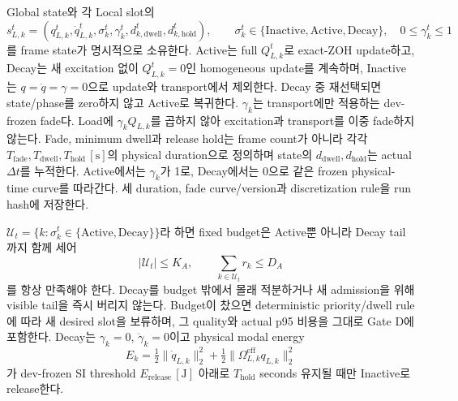 \documentclass[11pt]{article}
\begin{document}
Global state와 각 Local slot의
\begin{equation}
  s_{L,k}^t=(q_{L,k}^t,\dot q_{L,k}^t,\sigma_k^t,\gamma_k^t,
  d_{k,\mathrm{dwell}}^t,d_{k,\mathrm{hold}}^t),\qquad
  \sigma_k^t\in\{\mathrm{Inactive},\mathrm{Active},\mathrm{Decay}\},\quad
  0\le\gamma_k^t\le1
  \label{eq:rd-local-runtime-state}
\end{equation}
를 frame state가 명시적으로 소유한다. Active는 full \(Q_{L,k}^t\)로 exact-ZOH update하고,
Decay는 새 excitation 없이 \(Q_{L,k}^t=0\)인 homogeneous update를 계속하며,
Inactive는 \(q=\dot q=\gamma=0\)으로 update와 transport에서 제외한다.
Decay 중 재선택되면 state/phase를 zero하지 않고 Active로 복귀한다.
\(\gamma_k\)는 transport에만 적용하는 dev-frozen fade다. Load에
\(\gamma_k Q_{L,k}\)를 곱하지 않아 excitation과 transport를 이중 fade하지 않는다.
Fade, minimum dwell과 release hold는 frame count가 아니라 각각
\(T_{\mathrm{fade}},T_{\mathrm{dwell}},T_{\mathrm{hold}}\,[\mathrm s]\)의 physical duration으로
정의하며 state의 \(d_{\mathrm{dwell}},d_{\mathrm{hold}}\)는 actual \(\Delta t\)를 누적한다.
Active에서는 \(\gamma_k\)가 1로, Decay에서는 0으로 같은 frozen physical-time curve를 따라간다.
세 duration, fade curve/version과 discretization rule을 run hash에 저장한다.

\(\mathcal U_t=\{k:\sigma_k^t\in\{\mathrm{Active},\mathrm{Decay}\}\}\)라 하면 fixed budget은
Active뿐 아니라 Decay tail까지 함께 세어
\[
  |\mathcal U_t|\le K_A,\qquad \sum_{k\in\mathcal U_t}r_k\le D_A
\]
를 항상 만족해야 한다. Decay를 budget 밖에서 몰래 적분하거나 새 admission을 위해 visible tail을 즉시
버리지 않는다. Budget이 찼으면 deterministic priority/dwell rule에 따라 새 desired slot을 보류하며,
그 quality와 actual p95 비용을 그대로 Gate D에 포함한다. Decay는 \(\gamma_k=0\),
\(\dot\gamma_k=0\)이고 physical modal energy
\[
  E_k=\tfrac12\|\dot q_{L,k}\|_2^2+
  \tfrac12\|\Omega_{L,k}^{\mathrm{eff}}q_{L,k}\|_2^2
\]
가 dev-frozen SI threshold \(E_{\mathrm{release}}\,[\mathrm J]\) 아래로
\(T_{\mathrm{hold}}\) seconds 유지될 때만 Inactive로 release한다.
\end{document}
